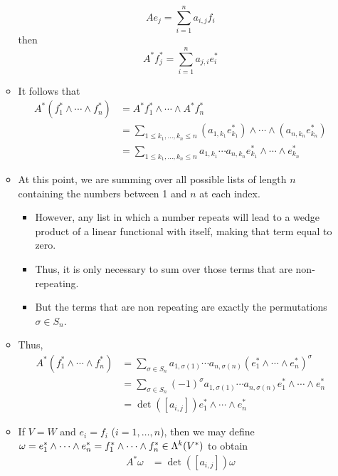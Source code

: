 \documentclass[../notes.tex]{subfiles}
\begin{document}
\begin{itemize}
\begin{itemize}
        \begin{equation*}
            Ae_j = \sum_{i=1}^na_{i,j}f_i
        \end{equation*}
        then
        \begin{equation*}
            A^*f_j^* = \sum_{i=1}^na_{j,i}e_i^*
        \end{equation*}
        \item It follows that
        \begin{align*}
            A^*(f_1^*\wedge\cdots\wedge f_n^*) &= A^*f_1^*\wedge\cdots\wedge A^*f_n^*\\
            &= \sum_{1\leq k_1,\dots,k_n\leq n}(a_{1,k_1}e_{k_1}^*)\wedge\cdots\wedge(a_{n,k_n}e_{k_n}^*)\\
            &= \sum_{1\leq k_1,\dots,k_n\leq n}a_{1,k_1}\cdots a_{n,k_n}e_{k_1}^*\wedge\cdots\wedge e_{k_n}^*
        \end{align*}
        \item At this point, we are summing over all possible lists of length $n$ containing the numbers between 1 and $n$ at each index.
        \begin{itemize}
            \item However, any list in which a number repeats will lead to a wedge product of a linear functional with itself, making that term equal to zero.
            \item Thus, it is only necessary to sum over those terms that are non-repeating.
            \item But the terms that are non repeating are exactly the permutations $\sigma\in S_n$.
        \end{itemize}
        \item Thus,
        \begin{align*}
            A^*(f_1^*\wedge\cdots\wedge f_n^*) &= \sum_{\sigma\in S_n}a_{1,\sigma(1)}\cdots a_{n,\sigma(n)}(e_1^*\wedge\cdots\wedge e_n^*)^\sigma\\
            &= \sum_{\sigma\in S_n}(-1)^\sigma a_{1,\sigma(1)}\cdots a_{n,\sigma(n)}e_1^*\wedge\cdots\wedge e_n^*\\
            &= \det([a_{i,j}])e_1^*\wedge\cdots\wedge e_n^*
        \end{align*}
        \item If $V=W$ and $e_i=f_i$ ($i=1,\dots,n$), then we may define $\omega=e_1^*\wedge\cdots\wedge e_n^*=f_1^*\wedge\cdots\wedge f_n^*\in\lam[k]{V^*}$ to obtain
        \begin{align*}
            A^*\omega &= \det([a_{i,j}])\omega

\end{align*}
\end{itemize}
\end{itemize}
\end{document}
